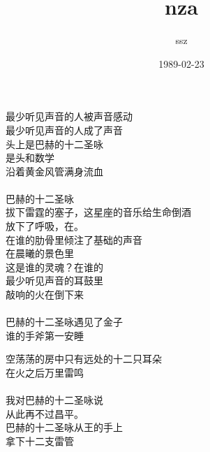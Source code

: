 \documentclass{article}
\title{nza}
\author{ssz}
\date{1989-02-23}
\begin{document}

\maketitle

\setlength\parindent{0pt}

\begin{center}

\begin{minipage}{0.5\linewidth}

\Large

﻿最少听见声音的人被声音感动 \\
最少听见声音的人成了声音 \\
头上是巴赫的十二圣咏 \\
是头和数学 \\
沿着黄金风管满身流血 \\
 \\
巴赫的十二圣咏 \\
拔下雷霆的塞子，这星座的音乐给生命倒酒 \\
放下了呼吸，在。 \\
在谁的肋骨里倾注了基础的声音 \\
在晨曦的景色里 \\
这是谁的灵魂？在谁的 \\
最少听见声音的耳鼓里 \\
敲响的火在倒下来 \\
 \\
巴赫的十二圣咏遇见了金子 \\
谁的手斧第一安睡 \\

\end{minipage}

\newpage

\begin{minipage}{0.5\linewidth}

\Large

空荡荡的房中只有远处的十二只耳朵 \\
在火之后万里雷鸣 \\
 \\
我对巴赫的十二圣咏说 \\
从此再不过昌平。 \\
巴赫的十二圣咏从王的手上 \\
拿下十二支雷管\end{minipage}

\end{center}
\end{document}
